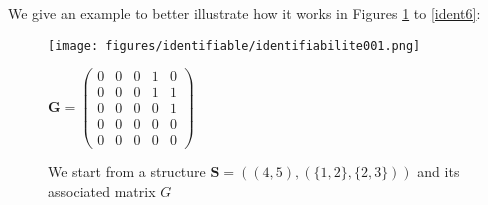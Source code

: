 \documentclass[12pt,a4paper]{report}
\begin{document}
We give an example to better illustrate how it works in Figures \ref{ident1} to \ref{ident6}:
\begin{figure}
	\begin{minipage}[l]{.45\linewidth}
\texttt{[image: figures/identifiable/identifiabilite001.png]} 
	\end{minipage}
	\begin{minipage}[c]{.45\linewidth}
		$\boldsymbol{G}=\left( \begin{array}{ccccc}
		0 & 0 & 0 & 1 & 0 \\ 
		0 & 0 & 0 & 1 & 1 \\ 
		0 & 0 & 0 & 0 & 1 \\ 
		0 & 0 & 0 & 0 & 0 \\ 
		0 & 0 & 0 & 0 & 0
		\end{array} \right)$
	\end{minipage}
	\caption{We start from a structure $\boldsymbol{S}=((4,5),(\{1,2\},\{2,3\}))$ and its associated matrix $G$}\label{ident1}
\end{figure}
		
\end{document}
